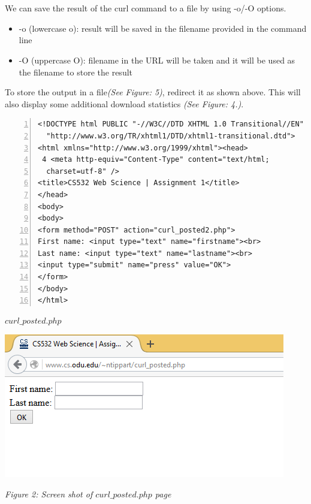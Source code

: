 \\
\\
We can save the result of the curl command to a file by using -o/-O options.
\begin{itemize}
	\item{-o (lowercase o): result will be saved in the filename provided in the command line}
	\item{-O (uppercase O): filename in the URL will be taken and it will be used as the filename to store the result}
\end{itemize}
 To store the output in a file\textit{(See Figure: 5)}, redirect it as shown above. This will also display some additional download statistics \textit{(See Figure: 4.)}. 

\newpage
\begin{lstlisting}[frame=single,numbers=left]
<!DOCTYPE html PUBLIC "-//W3C//DTD XHTML 1.0 Transitional//EN"
  "http://www.w3.org/TR/xhtml1/DTD/xhtml1-transitional.dtd">
<html xmlns="http://www.w3.org/1999/xhtml"><head>
 4 <meta http-equiv="Content-Type" content="text/html;
  charset=utf-8" />
<title>CS532 Web Science | Assignment 1</title>
</head>
<body>
<body>
<form method="POST" action="curl_posted2.php">
First name: <input type="text" name="firstname"><br>
Last name: <input type="text" name="lastname"><br>
<input type="submit" name="press" value="OK">
</form>
</body>
</html>
\end{lstlisting}
\centerline{\textbf{$curl\_posted.php$}}
\vspace{10pt}
\begin{center}
	\includegraphics[scale=1.375]{Q1/fig2.png}\\
	\centerline{\textit{Figure 2: Screen shot of $curl\_posted.php$ page}}
\end{center}



